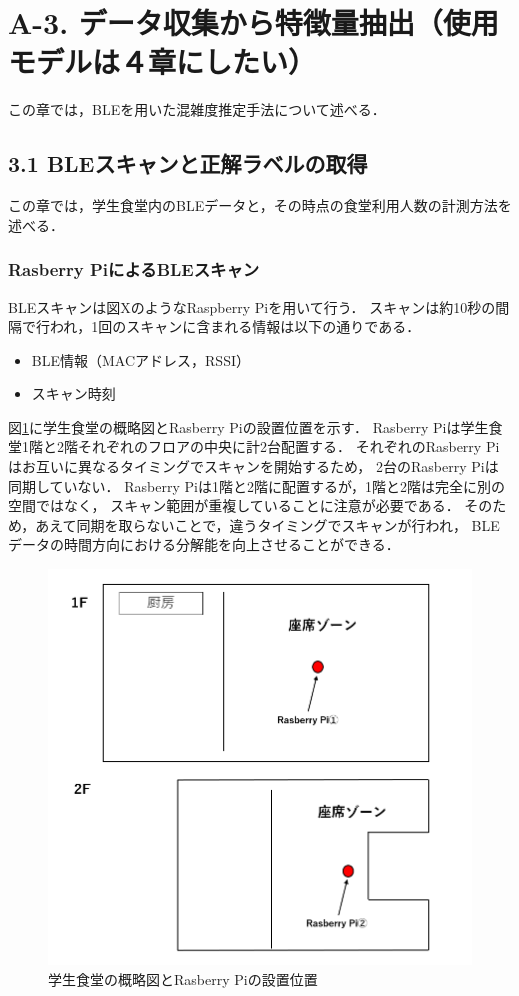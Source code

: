 \section*{A-3. データ収集から特徴量抽出（使用モデルは４章にしたい）}
この章では，BLEを用いた混雑度推定手法について述べる．

\subsection*{3.1 BLEスキャンと正解ラベルの取得}
この章では，学生食堂内のBLEデータと，その時点の食堂利用人数の計測方法を述べる．

\subsubsection*{Rasberry PiによるBLEスキャン}
BLEスキャンは図XのようなRaspberry Piを用いて行う．
スキャンは約10秒の間隔で行われ，1回のスキャンに含まれる情報は以下の通りである．
\begin{itemize}
  \item BLE情報（MACアドレス，RSSI）
  \item スキャン時刻
\end{itemize}
図\ref{raspi_place}に学生食堂の概略図とRasberry Piの設置位置を示す．
Rasberry Piは学生食堂1階と2階それぞれのフロアの中央に計2台配置する．
それぞれのRasberry Piはお互いに異なるタイミングでスキャンを開始するため，
2台のRasberry Piは同期していない．
Rasberry Piは1階と2階に配置するが，1階と2階は完全に別の空間ではなく，
スキャン範囲が重複していることに注意が必要である．
そのため，あえて同期を取らないことで，違うタイミングでスキャンが行われ，
BLEデータの時間方向における分解能を向上させることができる．
\begin{figure}[pt]
  \includegraphics[scale=0.4]{./images/place_raspi.png}
  \centering
  \caption{学生食堂の概略図とRasberry Piの設置位置\label{raspi_place}}
\end{figure}


